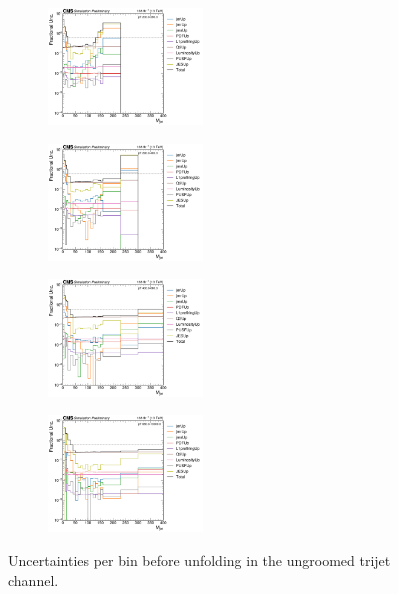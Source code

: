 \begin{figure}[ht!]
  \centering
  \begin{subfigure}
    \centering
    \includegraphics[width=0.45\textwidth]{figures/multijet/trijet/fracUnc_ungroomed_0.pdf}
\end{subfigure} 
  \begin{subfigure}
    \centering
    \includegraphics[width=0.45\textwidth]{figures/multijet/trijet/fracUnc_ungroomed_1.pdf}
\end{subfigure}
  \begin{subfigure}
    \centering
    \includegraphics[width=0.45\textwidth]{figures/multijet/trijet/fracUnc_ungroomed_2.pdf}
\end{subfigure}
  \begin{subfigure}
    \centering
    \includegraphics[width=0.45\textwidth]{figures/multijet/trijet/fracUnc_ungroomed_3.pdf}
\end{subfigure}
  \caption{Uncertainties per bin before unfolding in the ungroomed trijet channel.}
  \label{fig:trijetunc_ungroomed}
  \end{figure}
